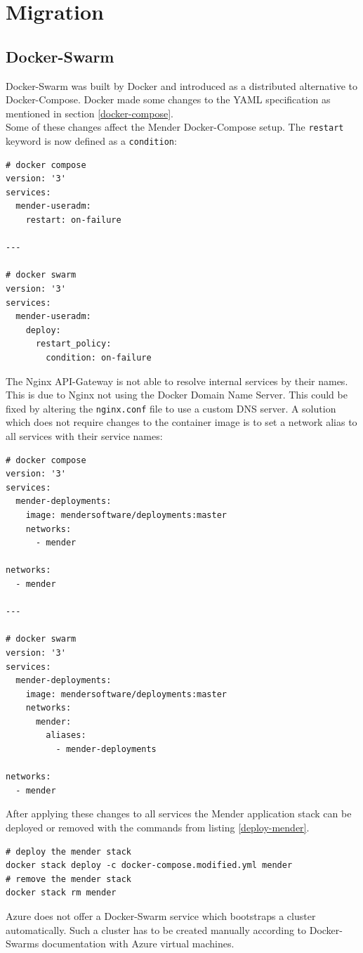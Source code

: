 \section{Migration}
\subsection{Docker-Swarm}
Docker-Swarm was built by Docker and introduced as a distributed alternative to Docker-Compose. Docker made some changes to the YAML specification as mentioned in section \ref{docker-compose}.\\
Some of these changes affect the Mender Docker-Compose setup. The \verb|restart| keyword is now defined as a \verb|condition|:
\begin{code}
  \begin{verbatim}
# docker compose
version: '3'
services:
  mender-useradm:
    restart: on-failure

---

# docker swarm
version: '3'
services:
  mender-useradm:
    deploy:
      restart_policy:
        condition: on-failure
  \end{verbatim}
\end{code}
The Nginx API-Gateway is not able to resolve internal services by their names. This is due to Nginx not using the Docker Domain Name Server. This could be fixed by altering the \verb|nginx.conf| file to use a custom DNS server. A solution which does not require changes to the container image is to set a network alias to all services with their service names:
\begin{code}
  \begin{verbatim}
# docker compose
version: '3'
services:
  mender-deployments:
    image: mendersoftware/deployments:master
    networks:
      - mender

networks:
  - mender

---

# docker swarm
version: '3'
services:
  mender-deployments:
    image: mendersoftware/deployments:master
    networks:
      mender:
        aliases:
          - mender-deployments

networks:
  - mender
  \end{verbatim}
\end{code}
After applying these changes to all services the Mender application stack can be deployed or removed with the commands from listing \ref{deploy-mender}.
\begin{code}
  \label{deploy-mender}
  \begin{verbatim}
# deploy the mender stack
docker stack deploy -c docker-compose.modified.yml mender
# remove the mender stack
docker stack rm mender
  \end{verbatim}
\end{code}
Azure does not offer a Docker-Swarm service which bootstraps a cluster automatically. Such a cluster has to be created manually according to Docker-Swarms documentation with Azure virtual machines.

